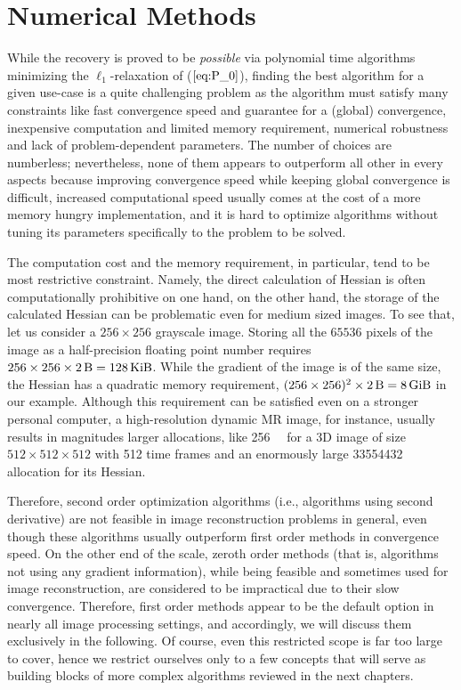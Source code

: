 \section{Numerical Methods}

While the recovery is proved to be \textit{possible} via polynomial time algorithms minimizing the $\ell_1$-relaxation of ($\ref{eq:P_0}$), finding the best algorithm for a given use-case is a quite challenging problem as the algorithm must satisfy many constraints like fast convergence speed and guarantee for a (global) convergence, inexpensive computation and limited memory requirement, numerical robustness and lack of problem-dependent parameters. The number of choices are numberless; nevertheless, none of them appears to outperform all other in every aspects because improving convergence speed while keeping global convergence is difficult, increased computational speed usually comes at the cost of a more memory hungry implementation, and it is hard to optimize algorithms without tuning its parameters specifically to the problem to be solved.

The computation cost and the memory requirement, in particular, tend to be most restrictive constraint. Namely, the direct calculation of Hessian is often computationally prohibitive on one hand, on the other hand, the storage of the calculated Hessian can be problematic even for medium sized images. To see that, let us consider a $256 \times 256$ grayscale image. Storing all the $65536$ pixels of the image as a half-precision floating point number requires $256 \times 256 \times \SI{2}{\byte} = \SI{128}{\kibi\byte}$. While the gradient of the image is of the same size, the Hessian has a quadratic memory requirement, $(256 \times 256)^2 \times \SI{2}{\byte} = \SI{8}{\gibi\byte}$ in our example. Although this requirement can be satisfied even on a stronger personal computer, a high-resolution dynamic MR image, for instance, usually results in magnitudes larger allocations, like \SI{256}{\gibi\byte} for a 3D image of size $512\times512\times512$ with 512 time frames and an enormously large \SI{33554432}{\tebi\byte} allocation for its Hessian. 

Therefore, second order optimization algorithms (i.e., algorithms using second derivative) are not feasible in image reconstruction problems in general, even though these algorithms usually outperform first order methods in convergence speed. On the other end of the scale, zeroth order methods (that is, algorithms not using any gradient information), while being feasible and sometimes used for image reconstruction, are considered to be impractical due to their slow convergence. Therefore, first order methods appear to be the default option in nearly all image processing settings, and accordingly, we will discuss them exclusively in the following. Of course, even this restricted scope is far too large to cover, hence we restrict ourselves only to a few concepts that will serve as building blocks of more complex algorithms reviewed in the next chapters.


